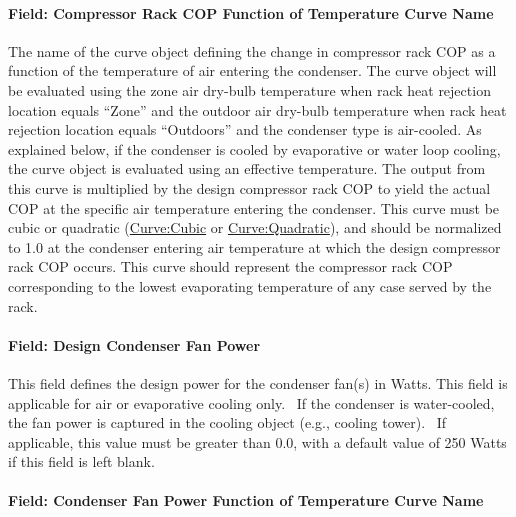\paragraph{Field: Compressor Rack COP Function of Temperature Curve Name}\label{field-compressor-rack-cop-function-of-temperature-curve-name}

The name of the curve object defining the change in compressor rack COP as a function of the temperature of air entering the condenser. The curve object will be evaluated using the zone air dry-bulb temperature when rack heat rejection location equals ``Zone'' and the outdoor air dry-bulb temperature when rack heat rejection location equals ``Outdoors'' and the condenser type is air-cooled. As explained below, if the condenser is cooled by evaporative or water loop cooling, the curve object is evaluated using an effective temperature. The output from this curve is multiplied by the design compressor rack COP to yield the actual COP at the specific air temperature entering the condenser. This curve must be cubic or quadratic (\hyperref[curvecubic]{Curve:Cubic} or \hyperref[curvequadratic]{Curve:Quadratic}), and should be normalized to 1.0 at the condenser entering air temperature at which the design compressor rack COP occurs. This curve should represent the compressor rack COP corresponding to the lowest evaporating temperature of any case served by the rack.

\paragraph{Field: Design Condenser Fan Power}\label{field-design-condenser-fan-power}

This field defines the design power for the condenser fan(s) in Watts. This field is applicable for air or evaporative cooling only.~ If the condenser is water-cooled, the fan power is captured in the cooling object (e.g., cooling tower).~ If applicable, this value must be greater than 0.0, with a default value of 250 Watts if this field is left blank.

\paragraph{Field: Condenser Fan Power Function of Temperature Curve Name}\label{field-condenser-fan-power-function-of-temperature-curve-name}

